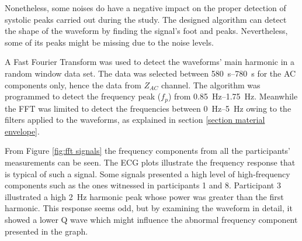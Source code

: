 Nonetheless, some noises do have a negative impact on the proper detection of systolic peaks carried out during the study. The designed algorithm can detect the shape of the waveform by finding the signal's foot and peaks. Nevertheless, some of its peaks might be missing due to the noise levels.

A Fast Fourier Transform was used to detect the waveforms' main harmonic in a random window data set. The data was selected between \SIrange{580}{780}{\second} for the AC components only, hence the data from $Z_{AC}$ channel. The algorithm was programmed to detect the frequency peak ($f_p$) from \SIrange{0.85}{1.75}{\hertz}. Meanwhile the FFT was limited to detect the frequencies between \SIrange{0}{5}{\hertz} owing to the filters applied to the waveforms, as explained in section \ref{section material envelope}.

From Figure \ref{fig:fft signals} the frequency components from all the participants' measurements can be seen. The ECG plots illustrate the frequency response that is typical of such a signal. Some signals presented a high level of high-frequency components such as the ones witnessed in participants 1 and 8. Participant 3 illustrated a high \SI{2}{\hertz} harmonic peak whose power was greater than the first harmonic. This response seems odd, but by examining the waveform in detail, it showed a lower Q wave which might influence the abnormal frequency component presented in the graph.

